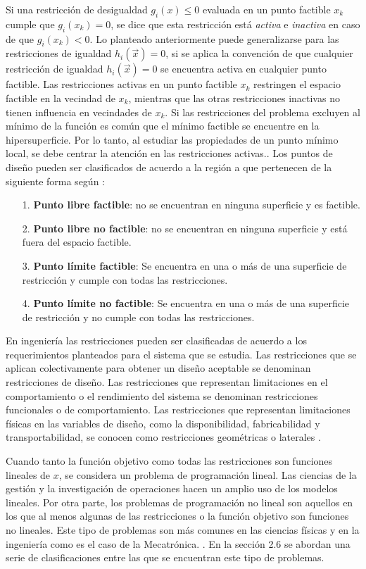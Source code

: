 Si una restricción de desigualdad $g_i(x) \leq 0$ evaluada en un punto factible $x_k$ cumple que $g_i(x_k)=0$, se dice que esta restricción está \textit{activa}  e \textit{inactiva} en caso de que $g_i(x_k) < 0$. Lo planteado anteriormente puede generalizarse  para las restricciones de igualdad $h_i(\vec{x})=0$, si se aplica la convención de que cualquier restricción de igualdad $h_i(\vec{x})=0$ se encuentra activa en cualquier punto factible. Las restricciones activas en un punto factible $x_k$ restringen el espacio factible en la vecindad de $x_k$, mientras que las otras restricciones inactivas no tienen influencia en vecindades de $x_k$. Si las restricciones del problema excluyen al mínimo de la función es común que el mínimo factible se encuentre en la hipersuperficie. Por lo tanto, al estudiar las propiedades de un punto mínimo local, se debe centrar la  atención en las restricciones activas.\cite{luenberger_linear_2015}. Los puntos de diseño pueden ser clasificados de acuerdo a la región a que pertenecen de la siguiente forma según \cite{rao_engineering_2009}:
\begin{itemize}
\item[1.] \textbf{Punto libre factible}: no se encuentran en ninguna superficie y es factible.
\item[2.] \textbf{Punto libre no factible}:  no se encuentran en ninguna superficie y está fuera del espacio factible.
\item[3.] \textbf{Punto límite factible}:  Se encuentra en una o más de una superficie de restricción y cumple con todas las restricciones.
\item[4.] \textbf{Punto límite no factible}: Se encuentra en una o más de una superficie de restricción y no cumple con todas las restricciones.
 \end{itemize}

En ingeniería las restricciones pueden ser clasificadas de acuerdo a los requerimientos planteados para el sistema que se estudia. Las restricciones que se aplican colectivamente para obtener un diseño aceptable se denominan restricciones de diseño. Las restricciones que representan limitaciones en el comportamiento o el rendimiento del sistema se denominan restricciones funcionales o de comportamiento. Las restricciones que representan limitaciones físicas en las variables de diseño, como la disponibilidad, fabricabilidad y transportabilidad, se conocen como restricciones geométricas o laterales  \cite{rao_engineering_2009}.

Cuando tanto la función objetivo como todas las restricciones son funciones lineales de $x$, se considera un problema de programación lineal. Las ciencias de la gestión y la investigación de operaciones hacen un amplio uso de los modelos lineales. Por otra parte, los problemas de programación no lineal son aquellos en los que al menos algunas de las restricciones o la función objetivo son funciones no lineales. Este tipo de problemas son más comunes en las ciencias físicas y en la ingeniería como es el caso de la Mecatrónica. \cite{nocedal2006numerical}. En la sección 2.6 se abordan una serie de clasificaciones entre las que se encuentran este tipo de problemas. 

